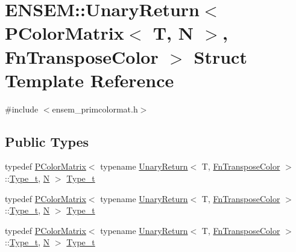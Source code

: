 \hypertarget{structENSEM_1_1UnaryReturn_3_01PColorMatrix_3_01T_00_01N_01_4_00_01FnTransposeColor_01_4}{}\section{E\+N\+S\+EM\+:\+:Unary\+Return$<$ P\+Color\+Matrix$<$ T, N $>$, Fn\+Transpose\+Color $>$ Struct Template Reference}
\label{structENSEM_1_1UnaryReturn_3_01PColorMatrix_3_01T_00_01N_01_4_00_01FnTransposeColor_01_4}


{\ttfamily \#include $<$ensem\+\_\+primcolormat.\+h$>$}

\subsection*{Public Types}
\begin{DoxyCompactItemize}
\item 
typedef \mbox{\hyperlink{classENSEM_1_1PColorMatrix}{P\+Color\+Matrix}}$<$ typename \mbox{\hyperlink{structENSEM_1_1UnaryReturn}{Unary\+Return}}$<$ T, \mbox{\hyperlink{structENSEM_1_1FnTransposeColor}{Fn\+Transpose\+Color}} $>$\+::\mbox{\hyperlink{structENSEM_1_1UnaryReturn_3_01PColorMatrix_3_01T_00_01N_01_4_00_01FnTransposeColor_01_4_a572cabe45776b7d618458aa2b8d8a7ac}{Type\+\_\+t}}, \mbox{\hyperlink{adat__devel_2lib_2hadron_2operator__name__util_8cc_a7722c8ecbb62d99aee7ce68b1752f337}{N}} $>$ \mbox{\hyperlink{structENSEM_1_1UnaryReturn_3_01PColorMatrix_3_01T_00_01N_01_4_00_01FnTransposeColor_01_4_a572cabe45776b7d618458aa2b8d8a7ac}{Type\+\_\+t}}
\item 
typedef \mbox{\hyperlink{classENSEM_1_1PColorMatrix}{P\+Color\+Matrix}}$<$ typename \mbox{\hyperlink{structENSEM_1_1UnaryReturn}{Unary\+Return}}$<$ T, \mbox{\hyperlink{structENSEM_1_1FnTransposeColor}{Fn\+Transpose\+Color}} $>$\+::\mbox{\hyperlink{structENSEM_1_1UnaryReturn_3_01PColorMatrix_3_01T_00_01N_01_4_00_01FnTransposeColor_01_4_a572cabe45776b7d618458aa2b8d8a7ac}{Type\+\_\+t}}, \mbox{\hyperlink{adat__devel_2lib_2hadron_2operator__name__util_8cc_a7722c8ecbb62d99aee7ce68b1752f337}{N}} $>$ \mbox{\hyperlink{structENSEM_1_1UnaryReturn_3_01PColorMatrix_3_01T_00_01N_01_4_00_01FnTransposeColor_01_4_a572cabe45776b7d618458aa2b8d8a7ac}{Type\+\_\+t}}
\item 
typedef \mbox{\hyperlink{classENSEM_1_1PColorMatrix}{P\+Color\+Matrix}}$<$ typename \mbox{\hyperlink{structENSEM_1_1UnaryReturn}{Unary\+Return}}$<$ T, \mbox{\hyperlink{structENSEM_1_1FnTransposeColor}{Fn\+Transpose\+Color}} $>$\+::\mbox{\hyperlink{structENSEM_1_1UnaryReturn_3_01PColorMatrix_3_01T_00_01N_01_4_00_01FnTransposeColor_01_4_a572cabe45776b7d618458aa2b8d8a7ac}{Type\+\_\+t}}, \mbox{\hyperlink{adat__devel_2lib_2hadron_2operator__name__util_8cc_a7722c8ecbb62d99aee7ce68b1752f337}{N}} $>$ \mbox{\hyperlink{structENSEM_1_1UnaryReturn_3_01PColorMatrix_3_01T_00_01N_01_4_00_01FnTransposeColor_01_4_a572cabe45776b7d618458aa2b8d8a7ac}{Type\+\_\+t}}
\end{DoxyCompactItemize}


